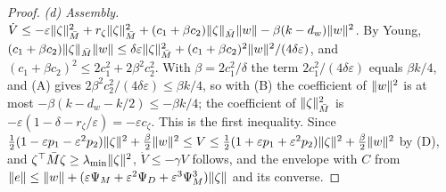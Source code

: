 \begin{proof}
\noindent\emph{(d) Assembly.}
$\dot V\le-\varepsilon\lVert \zeta\rVert^2_{\bar M}+r_\zeta\lVert \zeta\rVert^2_{\bar M}
+(c_1+\beta c_2)\lVert \zeta\rVert_{\bar M}\lVert w\rVert-\beta(k-d_w)\lVert w\rVert^2$. By Young,
$(c_1+\beta c_2)\lVert \zeta\rVert_{\bar M}\lVert w\rVert\le\delta\varepsilon\lVert \zeta\rVert^2_{\bar M}
+(c_1+\beta c_2)^2\lVert w\rVert^2/(4\delta\varepsilon)$, and $(c_1+\beta c_2)^2\le2c_1^2+2\beta^2c_2^2$. With
$\beta=2c_1^2/\delta$ the term $2c_1^2/(4\delta\varepsilon)$ equals $\beta k/4$, and (A) gives
$2\beta^2c_2^2/(4\delta\varepsilon)\le\beta k/4$, so with (B) the coefficient of $\lVert w\rVert^2$ is at most
$-\beta(k-d_w-k/2)\le-\beta k/4$; the coefficient of $\lVert \zeta\rVert^2_{\bar M}$ is
$-\varepsilon(1-\delta-r_\zeta/\varepsilon)=-\varepsilon c_\zeta$. This is the first inequality. Since
$\frac12(1-\varepsilon p_1-\varepsilon^2p_2)\lVert \zeta\rVert^2+\frac\beta2\lVert w\rVert^2\le V
\le\frac12(1+\varepsilon p_1+\varepsilon^2p_2)\lVert \zeta\rVert^2+\frac\beta2\lVert w\rVert^2$ by (D), and
$\zeta^\top\bar M\zeta\ge\lambda_{\min}\lVert \zeta\rVert^2$, $\dot V\le-\gamma V$ follows, and the envelope with $C$ from
$\lVert e\rVert\le\lVert w\rVert+(\varepsilon\Psi_M+\varepsilon^2\Psi_D+\varepsilon^3\Psi_M^3)\lVert \zeta\rVert$ and its converse.
\end{proof}

